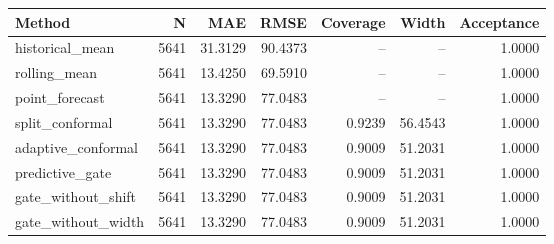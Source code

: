 \begin{tabular}{lrrrrrr}
\hline
Method & N & MAE & RMSE & Coverage & Width & Acceptance \\
\hline
historical\_mean & 5641 & 31.3129 & 90.4373 & -- & -- & 1.0000 \\
rolling\_mean & 5641 & 13.4250 & 69.5910 & -- & -- & 1.0000 \\
point\_forecast & 5641 & 13.3290 & 77.0483 & -- & -- & 1.0000 \\
split\_conformal & 5641 & 13.3290 & 77.0483 & 0.9239 & 56.4543 & 1.0000 \\
adaptive\_conformal & 5641 & 13.3290 & 77.0483 & 0.9009 & 51.2031 & 1.0000 \\
predictive\_gate & 5641 & 13.3290 & 77.0483 & 0.9009 & 51.2031 & 1.0000 \\
gate\_without\_shift & 5641 & 13.3290 & 77.0483 & 0.9009 & 51.2031 & 1.0000 \\
gate\_without\_width & 5641 & 13.3290 & 77.0483 & 0.9009 & 51.2031 & 1.0000 \\
\hline
\end{tabular}